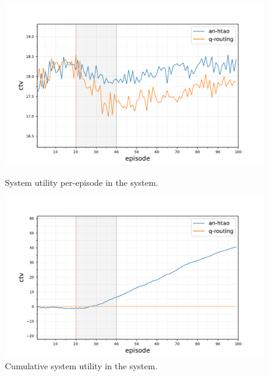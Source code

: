 \begin{figure}[ht]
	\begin{minipage}{.49\textwidth}
		\centering
		\includegraphics[width=1.0\linewidth,trim={25pt 0pt 50pt 0pt},clip]{7balanced_statistics-optimal-ctv}
		\captionsetup{labelfont=bf,singlelinecheck=on}
		\caption{System utility per-episode in the \newline \simulationNodeFailure{}{} system.}
		\label{fig:node_failure_ctv}
\end{minipage}
\begin{minipage}{.49\textwidth}
	\centering
	\includegraphics[width=1.0\linewidth,trim={25pt 0pt 50pt 0pt},clip]{7comparison_statistics-optimal-ctv-comparison-cumulative}
	\captionsetup{labelfont=bf,singlelinecheck=on}
		\caption{Cumulative system utility in the \simulationNodeFailure{}{}\newline system.}
		\label{fig:node_failure_cumulative_ctv}
\end{minipage}\hfill%
\end{figure}

